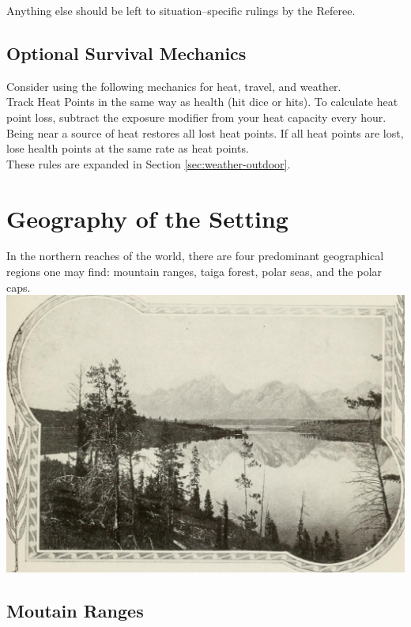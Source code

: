\documentclass[notitlepage]{article}
\begin{document}
\begin{multicols}{2}
Anything else should be left to situation--specific rulings by the Referee.

\subsection*{Optional Survival Mechanics}

Consider using the following mechanics for heat, travel, and weather. \\

Track Heat Points in the same way as health (hit dice or hits).
To calculate heat point loss, subtract the exposure modifier from your heat capacity every hour.
Being near a source of heat restores all lost heat points.
If all heat points are lost, lose health points at the same rate as heat points. \\

These rules are expanded in Section \ref{sec:weather-outdoor}.

\section{Geography of the Setting}

In the northern reaches of the world, there are four predominant geographical regions one may find: mountain ranges, taiga forest, polar seas, and the polar caps. \\

{\centering
\includegraphics[width=\columnwidth]{geography-mountains}
}


\subsection*{Moutain Ranges}


\end{multicols}
\end{document}
